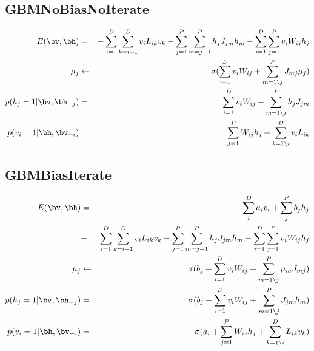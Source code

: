 \documentclass[a4paper]{jarticle}
\begin{document}
{\subsection{GBMNoBiasNoIterate}
\begin{eqnarray}
 E(\bv,\bh) &=&
  -\sum_{i=1}^{D} \sum_{k=i+1}^{D} v_i L_{ik} v_k
  -\sum_{j=1}^{P} \sum_{m=j+1}^{P} h_j J_{jm} h_m
  -\sum_{i=1}^{D} \sum_{j=1  }^{P} v_i W_{ij} h_j\\
 \mu_j &\leftarrow&
  \sigma(
   \sum_{i=1            }^{D} v_i    W_{ij}
  +\sum_{m=1\backslash j}^{P} J_{mj} \mu_j
  )\\
 p(h_j=1 | \bv, \bh_{-j})  &=&
    \sum_{i=1            }^{D} v_i W_{ij}
  + \sum_{m=1\backslash j}^{P} h_j J_{jm}\\
 p(v_i=1 | \bh, \bv_{-i}) &=&
   \sum_{j=1}^{P} W_{ij} h_j
  +\sum_{k=1\backslash i}^{D} v_i L_{ik} 
\end{eqnarray}
\newpage

\subsection{GBMBiasIterate}
\begin{eqnarray}
 E(\bv,\bh)
 &=& \sum_{i}^{D} a_i v_i +\sum_{j}^{P} b_j h_j\\
 &-& \sum_{i=1}^{D}\sum_{k=i+1}^{D} v_i L_{ik} v_k
  -  \sum_{j=1}^{P}\sum_{m=j+1}^{P} h_j J_{jm} h_m
  -  \sum_{i=1}^{D}\sum_{j=1}^{P} v_i W_{ij} h_j\\
 \mu_j &\leftarrow&
  \sigma(
  b_j 
  + \sum_{i=1            }^{D} v_i W_{ij}
  + \sum_{m=1\backslash j}^{P} \mu_m J_{mj}
  )\\
 p(h_j=1 | \bv, \bh_{-j}) &=&
  \sigma(
  b_j
  +\sum_{i=1            }^{D} v_i W_{ij}
  +\sum_{m=1\backslash j}^{P} J_{jm} h_m
  )\\
 p(v_i=1 |\bh, \bv_{-i}) &=&
  \sigma(
  a_i
  +\sum_{j=1            }^{P} W_{ij} h_j
  +\sum_{k=1\backslash i}^{D} L_{ik} v_k
  )\\
\end{eqnarray}
\newpage

}
\end{document}
